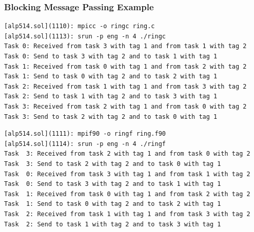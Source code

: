 \documentclass[10pt,t]{beamer}
\begin{document}
\begin{frame}
  \frametitle{Blocking Message Passing Example}
    \begin{columns}
      
      Fortran}]{./src/mpi/pingpong.f90}
    \end{columns}
    \framebreak
    \begin{columns}
      
      Fortran}]{./src/mpi/ring.f90}
    \end{columns}
  \framebreak
  \begin{exampleblock}{}
    \begin{lstlisting}
[alp514.sol](1110): mpicc -o ringc ring.c
[alp514.sol](1113): srun -p eng -n 4 ./ringc
Task 0: Received from task 3 with tag 1 and from task 1 with tag 2
Task 0: Send to task 3 with tag 2 and to task 1 with tag 1
Task 1: Received from task 0 with tag 1 and from task 2 with tag 2
Task 1: Send to task 0 with tag 2 and to task 2 with tag 1
Task 2: Received from task 1 with tag 1 and from task 3 with tag 2
Task 2: Send to task 1 with tag 2 and to task 3 with tag 1
Task 3: Received from task 2 with tag 1 and from task 0 with tag 2
Task 3: Send to task 2 with tag 2 and to task 0 with tag 1
    \end{lstlisting}
  \end{exampleblock}{}
  \begin{exampleblock}{}
    \begin{lstlisting}
[alp514.sol](1111): mpif90 -o ringf ring.f90
[alp514.sol](1114): srun -p eng -n 4 ./ringf
Task  3: Received from task 2 with tag 1 and from task 0 with tag 2
Task  3: Send to task 2 with tag 2 and to task 0 with tag 1
Task  0: Received from task 3 with tag 1 and from task 1 with tag 2
Task  0: Send to task 3 with tag 2 and to task 1 with tag 1
Task  1: Received from task 0 with tag 1 and from task 2 with tag 2
Task  1: Send to task 0 with tag 2 and to task 2 with tag 1
Task  2: Received from task 1 with tag 1 and from task 3 with tag 2
Task  2: Send to task 1 with tag 2 and to task 3 with tag 1
    \end{lstlisting}
  \end{exampleblock}
\end{frame}
\end{document}

